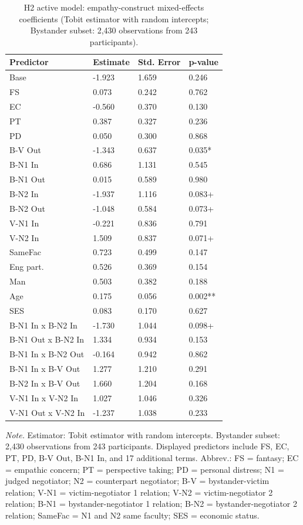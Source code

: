 \documentclass[11pt]{article}
\begin{document}
\begin{table}[H]
\centering
{\fontsize{11}{13}\selectfont
\renewcommand{\arraystretch}{1.10}
\caption{H2 active model: empathy-construct mixed-effects coefficients (Tobit estimator with random intercepts; Bystander subset: 2,430 observations from 243 participants).}
\label{tab:h2_b_bystander}
\begin{tabularx}{\textwidth}{>{\raggedright\arraybackslash}Xlll}
\toprule
Predictor & Estimate & Std. Error & p-value \\
\midrule
Base & -1.923 & 1.659 & 0.246 \\
FS & 0.073 & 0.242 & 0.762 \\
EC & -0.560 & 0.370 & 0.130 \\
PT & 0.387 & 0.327 & 0.236 \\
PD & 0.050 & 0.300 & 0.868 \\
B-V Out & -1.343 & 0.637 & 0.035* \\
B-N1 In & 0.686 & 1.131 & 0.545 \\
B-N1 Out & 0.015 & 0.589 & 0.980 \\
B-N2 In & -1.937 & 1.116 & 0.083+ \\
B-N2 Out & -1.048 & 0.584 & 0.073+ \\
V-N1 In & -0.221 & 0.836 & 0.791 \\
V-N2 In & 1.509 & 0.837 & 0.071+ \\
SameFac & 0.723 & 0.499 & 0.147 \\
Eng part. & 0.526 & 0.369 & 0.154 \\
Man & 0.503 & 0.382 & 0.188 \\
Age & 0.175 & 0.056 & 0.002** \\
SES & 0.083 & 0.170 & 0.627 \\
B-N1 In x B-N2 In & -1.730 & 1.044 & 0.098+ \\
B-N1 Out x B-N2 In & 1.334 & 0.934 & 0.153 \\
B-N1 In x B-N2 Out & -0.164 & 0.942 & 0.862 \\
B-N1 In x B-V Out & 1.277 & 1.210 & 0.291 \\
B-N2 In x B-V Out & 1.660 & 1.204 & 0.168 \\
V-N1 In x V-N2 In & 1.027 & 1.046 & 0.326 \\
V-N1 Out x V-N2 In & -1.237 & 1.038 & 0.233 \\
\bottomrule
\end{tabularx}
}
\end{table}
\begin{flushleft}
\footnotesize\textit{Note.} Estimator: Tobit estimator with random intercepts. Bystander subset: 2,430 observations from 243 participants. Displayed predictors include FS, EC, PT, PD, B-V Out, B-N1 In, and 17 additional terms. Abbrev.: FS = fantasy; EC = empathic concern; PT = perspective taking; PD = personal distress; N1 = judged negotiator; N2 = counterpart negotiator; B-V = bystander-victim relation; V-N1 = victim-negotiator 1 relation; V-N2 = victim-negotiator 2 relation; B-N1 = bystander-negotiator 1 relation; B-N2 = bystander-negotiator 2 relation; SameFac = N1 and N2 same faculty; SES = economic status.
\end{flushleft}
\end{document}
